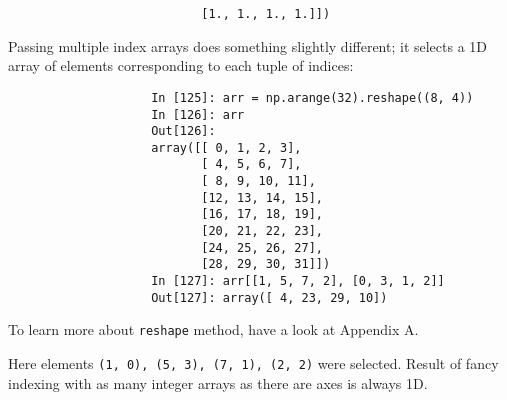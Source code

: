 \documentclass{article}
\begin{document}
\begin{enumerate}
\begin{itemize}
\begin{itemize}
\begin{itemize}
\begin{verbatim}
					       [1., 1., 1., 1.]])
				\end{verbatim}
				Passing multiple index arrays does something slightly different; it selects a 1D array of elements corresponding to each tuple of indices:
				\begin{verbatim}
					In [125]: arr = np.arange(32).reshape((8, 4))
					In [126]: arr
					Out[126]:
					array([[ 0, 1, 2, 3],
					       [ 4, 5, 6, 7],
					       [ 8, 9, 10, 11],
					       [12, 13, 14, 15],
					       [16, 17, 18, 19],
					       [20, 21, 22, 23],
					       [24, 25, 26, 27],
					       [28, 29, 30, 31]])
					In [127]: arr[[1, 5, 7, 2], [0, 3, 1, 2]]
					Out[127]: array([ 4, 23, 29, 10])
				\end{verbatim}
				To learn more about {\tt reshape} method, have a look at Appendix A.
				
				Here elements {\tt(1, 0), (5, 3), (7, 1), (2, 2)} were selected. Result of fancy indexing with as many integer arrays as there are axes is always 1D.
				

\end{itemize}
\end{itemize}
\end{itemize}
\end{enumerate}
\end{document}
